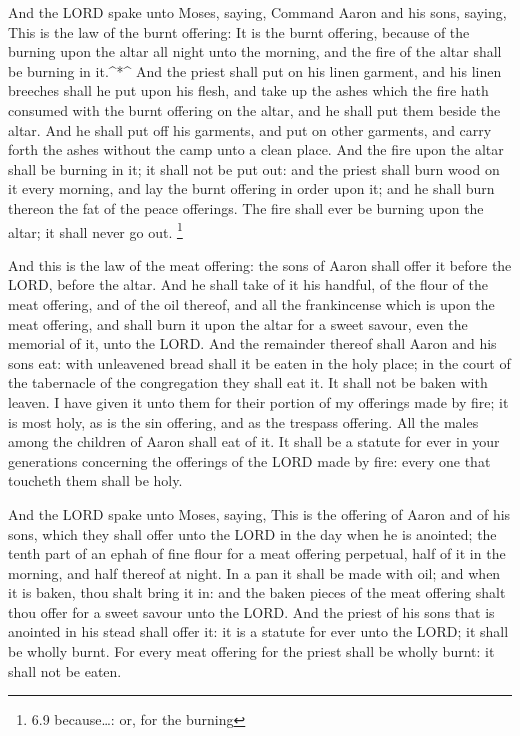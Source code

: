  And the LORD spake unto Moses, saying,  Command
Aaron and his sons, saying, This is the law of the burnt offering: It is
the burnt offering, because of the burning upon the altar all night unto
the morning, and the fire of the altar shall be burning in it.\^{}*\^{}
 And the priest shall put on his linen garment, and his
linen breeches shall he put upon his flesh, and take up the ashes which
the fire hath consumed with the burnt offering on the altar, and he
shall put them beside the altar.  And he shall put off his
garments, and put on other garments, and carry forth the ashes without
the camp unto a clean place.  And the fire upon the altar
shall be burning in it; it shall not be put out: and the priest shall
burn wood on it every morning, and lay the burnt offering in order upon
it; and he shall burn thereon the fat of the peace offerings.
 The fire shall ever be burning upon the altar; it shall
never go out. \footnote{6.9 because\ldots: or, for the burning}

 And this is the law of the meat offering: the sons of
Aaron shall offer it before the LORD, before the altar. 
And he shall take of it his handful, of the flour of the meat offering,
and of the oil thereof, and all the frankincense which is upon the meat
offering, and shall burn it upon the altar for a sweet savour, even the
memorial of it, unto the LORD.  And the remainder thereof
shall Aaron and his sons eat: with unleavened bread shall it be eaten in
the holy place; in the court of the tabernacle of the congregation they
shall eat it.  It shall not be baken with leaven. I have
given it unto them for their portion of my offerings made by fire; it is
most holy, as is the sin offering, and as the trespass offering.
 All the males among the children of Aaron shall eat of it.
It shall be a statute for ever in your generations concerning the
offerings of the LORD made by fire: every one that toucheth them shall
be holy.

 And the LORD spake unto Moses, saying,  This
is the offering of Aaron and of his sons, which they shall offer unto
the LORD in the day when he is anointed; the tenth part of an ephah of
fine flour for a meat offering perpetual, half of it in the morning, and
half thereof at night.  In a pan it shall be made with oil;
and when it is baken, thou shalt bring it in: and the baken pieces of
the meat offering shalt thou offer for a sweet savour unto the LORD.
 And the priest of his sons that is anointed in his stead
shall offer it: it is a statute for ever unto the LORD; it shall be
wholly burnt.  For every meat offering for the priest shall
be wholly burnt: it shall not be eaten.

